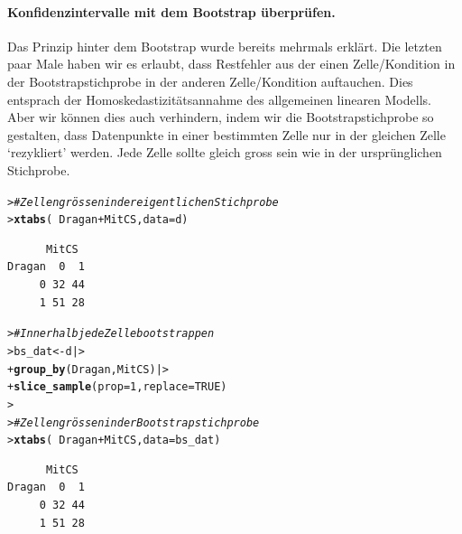 \documentclass[oneside, 10pt]{book}\usepackage[]{graphicx}\usepackage[]{xcolor}
\makeatletter
\newcommand{\hlnum}[1]{\textcolor[rgb]{0.686,0.059,0.569}{#1}}%
\newcommand{\hlcom}[1]{\textcolor[rgb]{0.678,0.584,0.686}{\textit{#1}}}%
\newcommand{\hlopt}[1]{\textcolor[rgb]{0,0,0}{#1}}%
\newcommand{\hlstd}[1]{\textcolor[rgb]{0.345,0.345,0.345}{#1}}%
\newcommand{\hlkwb}[1]{\textcolor[rgb]{0.69,0.353,0.396}{#1}}%
\newcommand{\hlkwc}[1]{\textcolor[rgb]{0.333,0.667,0.333}{#1}}%
\newcommand{\hlkwd}[1]{\textcolor[rgb]{0.737,0.353,0.396}{\textbf{#1}}}%
\newenvironment{kframe}{%
 \def\at@end@of@kframe{}%
 \ifinner\ifhmode%
  \def\at@end@of@kframe{\end{minipage}}%
  \begin{minipage}{\columnwidth}%
 \fi\fi%
 \def\FrameCommand##1{\hskip\@totalleftmargin \hskip-\fboxsep
 \colorbox{shadecolor}{##1}\hskip-\fboxsep
     \hskip-\linewidth \hskip-\@totalleftmargin \hskip\columnwidth}%
 \MakeFramed {\advance\hsize-\width
   \@totalleftmargin\z@ \linewidth\hsize
   \@setminipage}}%
 {\par\unskip\endMakeFramed%
 \at@end@of@kframe}
\newenvironment{knitrout}{}{} %
\makeatother
\begin{document}
\paragraph{Konfidenzintervalle mit dem Bootstrap überprüfen.}
Das Prinzip hinter dem Bootstrap wurde bereits mehrmals erklärt.
Die letzten paar Male haben wir es erlaubt, dass Restfehler
aus der einen Zelle/Kondition in der Bootstrapstichprobe in der
anderen Zelle/Kondition auftauchen. Dies entsprach der Homoskedastizitäts\-annahme
des allgemeinen linearen Modells. Aber wir können dies auch verhindern,
indem wir die Bootstrapstichprobe so gestalten, dass Datenpunkte
in einer bestimmten Zelle nur in der gleichen Zelle `rezykliert' werden.
Jede Zelle sollte gleich gross sein wie in der ursprünglichen Stichprobe.
\begin{knitrout}
\color{fgcolor}\begin{kframe}
\begin{alltt}
\hlstd{> }\hlcom{# Zellengrössen in der eigentlichen Stichprobe}
\hlstd{> }\hlkwd{xtabs}\hlstd{(}\hlopt{~} \hlstd{Dragan} \hlopt{+} \hlstd{MitCS,} \hlkwc{data} \hlstd{= d)}
\end{alltt}
\begin{verbatim}
      MitCS
Dragan  0  1
     0 32 44
     1 51 28
\end{verbatim}
\begin{alltt}
\hlstd{> }\hlcom{# Innerhalb jede Zelle bootstrappen}
\hlstd{> }\hlstd{bs_dat} \hlkwb{<-} \hlstd{d |>}
\hlstd{+ }  \hlkwd{group_by}\hlstd{(Dragan, MitCS) |>}
\hlstd{+ }  \hlkwd{slice_sample}\hlstd{(}\hlkwc{prop} \hlstd{=} \hlnum{1}\hlstd{,} \hlkwc{replace} \hlstd{=} \hlnum{TRUE}\hlstd{)}
\hlstd{> }
\hlstd{> }\hlcom{# Zellengrössen in der Bootstrapstichprobe}
\hlstd{> }\hlkwd{xtabs}\hlstd{(}\hlopt{~} \hlstd{Dragan} \hlopt{+} \hlstd{MitCS,} \hlkwc{data} \hlstd{= bs_dat)}
\end{alltt}
\begin{verbatim}
      MitCS
Dragan  0  1
     0 32 44
     1 51 28
\end{verbatim}
\end{kframe}
\end{knitrout}
\end{document}
